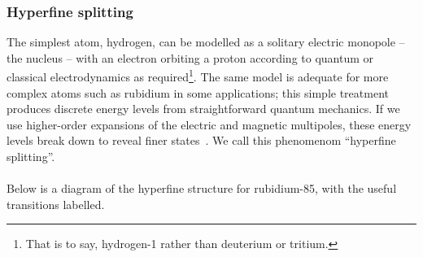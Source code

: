 \documentclass[11pt,twoside,a4paper]{article}
\begin{document}
\subsubsection{Hyperfine splitting}
The simplest atom, hydrogen, can be modelled as a solitary electric monopole -- the nucleus -- with an electron orbiting a proton according to quantum or classical electrodynamics as required\footnote{That is to say, hydrogen-1 rather than deuterium or tritium.}. The same
model is adequate for more complex atoms such as rubidium in some applications; this simple treatment produces discrete energy levels from straightforward quantum mechanics. If we use higher-order expansions
of the electric and magnetic multipoles, these energy levels break down to reveal finer states~\cite{satspec}. We call this phenomenom ``hyperfine splitting''.
\\\\
Below is a diagram of the hyperfine structure for rubidium-85, with the useful transitions labelled.
\end{document}
